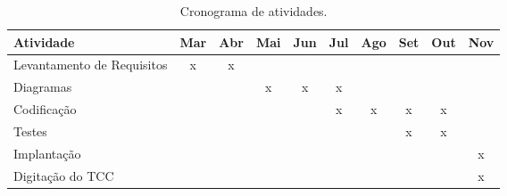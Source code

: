 \begin{table}[htb]
\centering
\caption{Cronograma de atividades.}
\label{meucronograma}
\begin{tabular}{@{}lccccccccc@{}}
\toprule
Atividade                  & \multicolumn{1}{l}{Mar} & \multicolumn{1}{l}{Abr} & \multicolumn{1}{l}{Mai} & \multicolumn{1}{l}{Jun} & \multicolumn{1}{l}{Jul} & \multicolumn{1}{l}{Ago} & \multicolumn{1}{l}{Set} & \multicolumn{1}{l}{Out} & \multicolumn{1}{l}{Nov} \\ \midrule
Levantamento de Requisitos & x                       & x                       &                         &                         &                         &                         &                         &                         &                         \\
Diagramas                  &                         &                         & x                       & x                       & x                       &                         &                         &                         &                         \\
Codificação                &                         &                         &                         &                         & x                       & x                       & x                       & x                       &                         \\
Testes                     &                         &                         &                         &                         &                         &                         & x                       & x                       &                         \\
Implantação                &                         &                         &                         &                         &                         &                         &                         &                         & x                       \\ \midrule
Digitação do TCC           &                         &                         &                         &                         &                         &                         &                         &                         & x                       \\ \bottomrule
\end{tabular}
\end{table}
